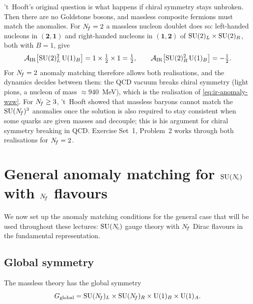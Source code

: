 \documentclass[11pt,a4paper]{article}
\begin{document}
\begin{remark}
  't~Hooft's original question \cite{tHooft1980} is what happens if chiral
  symmetry stays unbroken.  Then there are no Goldstone bosons, and
  massless composite fermions must match the anomalies.  For $N_{\!f} = 2$ a
  massless nucleon doublet does so: left-handed nucleons in
  $(\mathbf{2}, \mathbf{1})$ and right-handed nucleons in
  $(\mathbf{1}, \mathbf{2})$ of $\mathrm{SU}(2)_L \times \mathrm{SU}(2)_R$, both with
  $B = 1$, give
  \[
    \mathcal{A}_{\mathrm{IR}}\bigl[\mathrm{SU}(2)_L^2\,\mathrm{U}(1)_B\bigr]
    = 1 \times \tfrac{1}{2} \times 1 = \tfrac{1}{2},
    \qquad
    \mathcal{A}_{\mathrm{IR}}\bigl[\mathrm{SU}(2)_R^2\,\mathrm{U}(1)_B\bigr] = -\tfrac{1}{2}.
  \]
  For $N_{\!f} = 2$ anomaly matching therefore allows both realisations, and
  the dynamics decides between them: the QCD vacuum breaks chiral symmetry
  (light pions, a nucleon of mass $\approx 940$~MeV), which is the
  realisation of \eqref{eq:ir-anomaly-wzw}.  For $N_{\!f} \geq 3$, 't~Hooft
  showed that massless baryons cannot match the $\mathrm{SU}(N_{\!f})^3$ anomalies once
  the solution is also required to stay consistent when some quarks are
  given masses and decouple; this is his argument for chiral symmetry
  breaking in QCD.  Exercise Set~1, Problem~2 works through both
  realisations for $N_{\!f} = 2$.
\end{remark}


\section{General anomaly matching for \texorpdfstring{$\mathrm{SU}(N_{\!c})$}{SU(Nc)}
  with \texorpdfstring{$N_{\!f}$}{Nf} flavours}
\label{sec:general-anomaly}

We now set up the anomaly matching conditions for the general case that
will be used throughout these lectures: $\mathrm{SU}(N_{\!c})$ gauge theory with
$N_{\!f}$ Dirac flavours in the fundamental representation.

\subsection{Global symmetry}
\label{subsec:global-sym}

The massless theory has the global symmetry
\begin{equation}
  G_{\text{global}}
  = \mathrm{SU}(N_{\!f})_L \times \mathrm{SU}(N_{\!f})_R \times \mathrm{U}(1)_B \times \mathrm{U}(1)_A.
  \label{eq:global-sym}
\end{equation}
\end{document}
